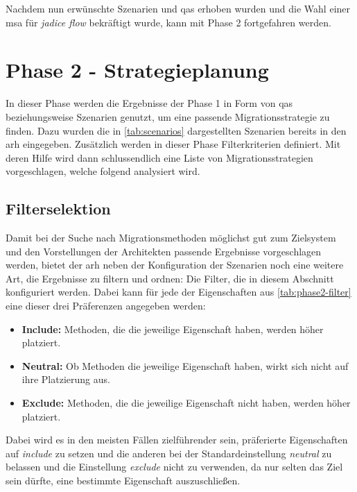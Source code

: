 Nachdem nun erwünschte Szenarien und \glspl{qa} erhoben wurden und die Wahl einer \gls{msa} für \emph{jadice flow} bekräftigt wurde, kann mit Phase 2 fortgefahren werden.

\section{Phase 2 - Strategieplanung}
\label{sec:durchführung-phase2}

In dieser Phase werden die Ergebnisse der Phase 1 in Form von \glspl{qa} beziehungsweise Szenarien genutzt, um eine passende Migrationsstrategie zu finden.
Dazu wurden die in \cref{tab:scenarios} dargestellten Szenarien bereits in den \gls{arh} eingegeben.
Zusätzlich werden in dieser Phase Filterkriterien definiert.
Mit deren Hilfe wird dann schlussendlich eine Liste von Migrationsstrategien vorgeschlagen, welche folgend analysiert wird.

\subsection{Filterselektion}
\label{sec:filterselektion}
Damit bei der Suche nach Migrationsmethoden möglichst gut zum Zielsystem und den Vorstellungen der Architekten passende Ergebnisse vorgeschlagen werden, bietet der \gls{arh} neben der Konfiguration der Szenarien noch eine weitere Art, die Ergebnisse zu filtern und ordnen: Die Filter, die in diesem Abschnitt konfiguriert werden.
Dabei kann für jede der Eigenschaften aus \cref{tab:phase2-filter} eine dieser drei Präferenzen angegeben werden:
\begin{itemize}
	\item \textbf{Include:} Methoden, die die jeweilige Eigenschaft haben, werden höher platziert.
	\item \textbf{Neutral:} Ob Methoden die jeweilige Eigenschaft haben, wirkt sich nicht auf ihre Platzierung aus.
	\item \textbf{Exclude:} Methoden, die die jeweilige Eigenschaft nicht haben, werden höher platziert.
\end{itemize}
Dabei wird es in den meisten Fällen zielführender sein, präferierte Eigenschaften auf \emph{include} zu setzen und die anderen bei der Standardeinstellung \emph{neutral} zu belassen und die Einstellung \emph{exclude} nicht zu verwenden, da nur selten das Ziel sein dürfte, eine bestimmte Eigenschaft auszuschließen.



